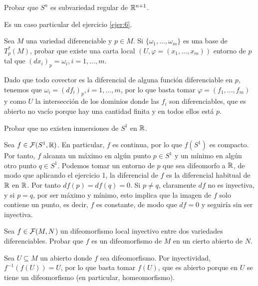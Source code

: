 \documentclass[twoside]{article}
\newcounter{ejercicio}
\begin{document}
\newpage

\begin{ejercicio}{8}
Probar que $S^n$ es subvariedad regular de $\mathbb{R}^{n+1}$.
\end{ejercicio}
\begin{solucion}
Es un caso particular del ejercicio \ref{ejer:6}.
\end{solucion}

\newpage

\begin{ejercicio}{9}
Sea $M$ una variedad diferenciable y $p\in M$. Si $\{\omega_1,\dots,\omega_m\}$ es una base de
$T^*_p (M)$, probar que existe una carta local $(U, \varphi = (x_1, \dots, x_m))$ entorno de
$p$ tal que $(dx_i)_p = \omega_i, i = 1, \dots,m$.
\end{ejercicio}
\begin{solucion}
Dado que todo covector es la diferencial de alguna función diferenciable en $p$, tenemos que $\omega_i=(df_i)_p, i=1,\dots, m$, por lo que basta tomar $\varphi=(f_1,\dots,f_m)$ y como $U$ la intersección de los dominios donde las $f_i$ son diferenciables, que es abierto no vacío porque hay una cantidad finita y en todos ellos está $p$.
\end{solucion}

\newpage

\begin{ejercicio}{10}
Probar que no existen inmersiones de $S^1$ en $\mathbb{R}$.
\end{ejercicio}
\begin{solucion}
Sea $f\in\mathcal{F}(S^1,\mathbb{R})$. En particular, $f$ es continua, por lo que $f(S^1)$ es compacto. Por tanto, $f$ alcanza un máximo en algún punto $p\in S^1$ y un mínimo en algún otro punto $q\in S^1$. Podemos tomar un entorno de $p$ que sea difeomorfo a $\mathbb{R}$, de modo que aplicando el ejercicio 1, la diferencial de $f$ es la diferencial habitual de $\mathbb{R}$ en $\mathbb{R}$. Por tanto $df(p)=df(q)=0$. Si $p\neq q$, claramente $df$ no es inyectiva, y si $p=q$, por ser máximo y mínimo, esto implica que la imagen de $f$ solo contiene un punto, es decir, $f$ es constante, de modo que $df=0$ y seguiría sin ser inyectiva.
\end{solucion}

\newpage

\begin{ejercicio}{11}
Sea $f \in \mathcal{F}(M,N$) un difeomorfismo local inyectivo entre dos variedades
diferenciables. Probar que $f$ es un difeomorfismo de $M$ en un cierto abierto
de $N$.
\end{ejercicio}
\begin{solucion}
Sea $U\subseteq M$ un abierto donde $f$ sea difeomorfismo. Por inyectividad, $f^{-1}(f(U))=U$, por lo que basta tomar $f(U)$, que es abierto porque en $U$ se tiene un difeomorfismo (en particular, homeomorfismo). 
\end{solucion}
\end{document}
